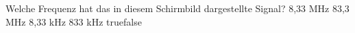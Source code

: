     {Welche Frequenz hat das in diesem Schirmbild dargestellte Signal?}
    {8,33 MHz}
    {83,3 MHz}
    {8,33 kHz}
    {833 kHz}
    {true}{false}